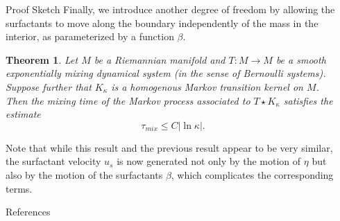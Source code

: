\documentclass[final,noamsthm]{beamer}
\newtheorem{thm}{Theorem}
\newcommand{\abs}[1]{\left\vert #1\right\vert}
\newlength{\sepwidth}
\newlength{\colwidth}
\newcommand{\separatorcolumn}{\begin{column}{\sepwidth}\end{column}}
\begin{document}
\begin{frame}[t]
\begin{columns}[t]
\begin{column}{\colwidth}
            \begin{block} {Proof Sketch}
                Finally, we introduce another degree of freedom by allowing the surfactants to move along the boundary independently of the mass in the interior, as parameterized by a function $\beta$.
                \begin{thm}
Let $M$ be a Riemannian manifold and $T: M \to M$ be a smooth exponentially mixing dynamical system (in the sense of Bernoulli systems).
			Suppose further that $K_\kappa$ is a homogenous Markov transition kernel on $M$.
			Then the mixing time of the Markov process associated to $T \star K_\kappa$ satisfies the estimate
			\[
				\tau_{mix} \le C\abs{\ln \kappa}.
			\]

                \end{thm}


                Note that while this result and the previous result appear to be very similar, the surfactant velocity $u_s$ is now generated not only by the motion of $\eta$ but also by the motion of the surfactants $\beta$, which complicates the corresponding terms. %
            \end{block}

            \begin{block}{References}
                \vspace{-0.3em}
                {
                    \small
                    \nocite{*}
                    \begin{multicols}{2}
                        
                        
                \end{multicols}}
            \end{block}
        \end{column}
        \separatorcolumn
    \end{columns}
\end{frame}
\end{document}
